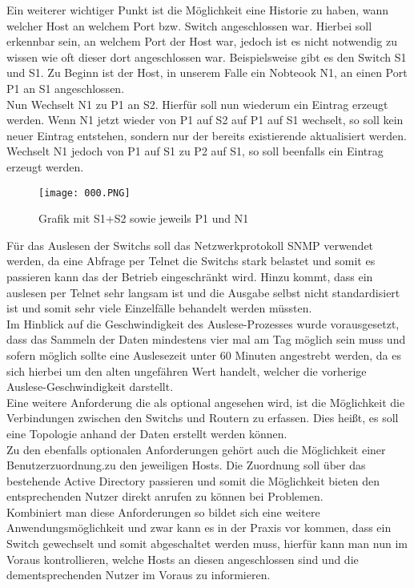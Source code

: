 Ein weiterer wichtiger Punkt ist die Möglichkeit eine Historie zu haben, wann welcher Host an welchem Port bzw. Switch angeschlossen war. Hierbei soll erkennbar sein, an welchem Port der Host war, jedoch ist es nicht notwendig zu wissen wie oft dieser dort angeschlossen war. Beispielsweise gibt es den Switch S1 und S1. Zu Beginn ist der Host, in unserem Falle ein Nobteook N1, an einen Port P1 an S1 angeschlossen.\\
Nun Wechselt N1 zu P1 an S2. Hierfür soll nun wiederum ein Eintrag erzeugt werden. Wenn N1 jetzt wieder von P1 auf S2 auf P1 auf S1 wechselt, so soll kein neuer Eintrag entstehen, sondern nur der bereits existierende aktualisiert werden. Wechselt N1 jedoch von P1 auf S1 zu P2 auf S1, so soll beenfalls ein Eintrag erzeugt werden.\\

\begin{figure}[H]
\centering
\texttt{[image: 000.PNG]}
\caption{Grafik mit S1+S2 sowie jeweils P1 und N1}
\label{fig:show_s1_s2_p1_n1}
\end{figure}


Für das Auslesen der Switchs soll das Netzwerkprotokoll SNMP verwendet werden, da eine Abfrage per Telnet die Switchs stark belastet und somit es passieren kann das der Betrieb eingeschränkt wird. Hinzu kommt, dass ein auslesen per Telnet sehr langsam ist und die Ausgabe selbst nicht standardisiert ist und somit sehr viele Einzelfälle behandelt werden müssten.\\
Im Hinblick auf die Geschwindigkeit des Auslese-Prozesses wurde vorausgesetzt, dass das Sammeln der Daten mindestens vier mal am Tag möglich sein muss und sofern möglich sollte eine Auslesezeit unter 60 Minuten angestrebt werden, da es sich hierbei um den alten ungefähren Wert handelt, welcher die vorherige Auslese-Geschwindigkeit darstellt.\\

Eine weitere Anforderung die als optional angesehen wird, ist die Möglichkeit die Verbindungen zwischen den Switchs und Routern zu erfassen. Dies heißt, es soll eine Topologie anhand der Daten erstellt werden können.\\
Zu den ebenfalls optionalen Anforderungen gehört auch die Möglichkeit einer Benutzerzuordnung.zu den jeweiligen Hosts. Die Zuordnung soll über das bestehende Active Directory passieren und somit die Möglichkeit bieten den entsprechenden Nutzer direkt anrufen zu können bei Problemen.\\
Kombiniert man diese Anforderungen so bildet sich eine weitere Anwendungsmöglichkeit und zwar kann es in der Praxis vor kommen, dass ein Switch gewechselt und somit abgeschaltet werden muss, hierfür kann man nun im Voraus kontrollieren, welche Hosts an diesen angeschlossen sind und die dementsprechenden Nutzer im Voraus zu informieren.\\

